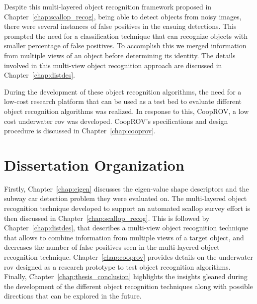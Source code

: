 \documentclass {udthesis}
\begin{document}
Despite this multi-layered object recognition framework proposed in Chapter~\ref{chap:scallop_recog}, being able to detect objects from noisy images, there were 
several instances of false positives in the ensuing detections. This prompted the need for a classification technique that can recognize objects with smaller percentage of
false positives. To accomplish this we merged information from multiple views of an object before determining its identity. The details involved in this
multi-view object recognition approach are discussed in Chapter~\ref{chap:distdes}.

During the development of these object recognition algorithms, the need for a low-cost research platform 
that can be used as a test bed to evaluate different object recognition algorithms was realized.
In response to this, CoopROV, a low cost underwater \gls{rov} was developed. CoopROV's specifications and 
design procedure is discussed in Chapter~\ref{chap:cooprov}.

\section{Dissertation Organization}

Firstly, Chapter~\ref{chap:eigen} discusses the eigen-value shape descriptors and the subway car detection problem they were evaluated on.
The multi-layered object recognition technique developed to support an automated scallop survey effort 
is then discussed in Chapter~\ref{chap:scallop_recog}.
This is followed by Chapter~\ref{chap:distdes}, that describes a multi-view object recognition technique that allows to combine information from multiple views of a target object, and decreases the number of false positives seen in the multi-layered object recognition technique.
Chapter~\ref{chap:cooprov} provides details on the underwater \gls{rov} designed as a research prototype to test object recognition algorithms.
Finally, Chapter~\ref{chap:thesis_conclusion} highlights the insights gleaned during the development of the different object recognition techniques along with possible directions that can be explored in the future.

\printglossary[type=\acronymtype]                  
\end{document}
